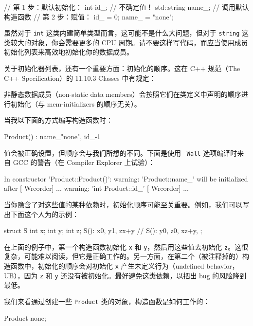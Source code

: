 \begin{codebox}[cpp]
// 第 1 步：默认初始化：
int id_; // 不确定值！
std::string name_; // 调用默认构造函数
// 第 2 步：赋值：
id_ = 0;
name_ = "none";
\end{codebox}

虽然对于 \texttt{int} 这类内建简单类型而言，这可能不是什么大问题，但对于 \texttt{string} 这类较大的对象，你会需要更多的 CPU 周期。请不要这样写代码，而应当使用成员初始化列表来高效地初始化你的数据成员。

关于初始化器列表，还有一个重要方面：初始化的顺序。这在 C++ 规范（The C++ Specification）的 11.10.3 Classes 中有规定：

\begin{myQuote}
非静态数据成员（non-static data members）会按照它们在类定义中声明的顺序进行初始化（与 mem-initializers 的顺序无关）。
\end{myQuote}

当我以下面的方式编写构造函数时：

\begin{codebox}[cpp]
Product() : name_{"none"}, id_{-1} { }
\end{codebox}

值会被正确设置，但顺序会与我们所想的不同。下面是使用 \texttt{-Wall} 选项编译时来自 GCC 的警告（在 Compiler Explorer 上试验）：

\begin{codebox}[cpp]
In constructor 'Product::Product()':
warning: 'Product::name_' will be initialized after [-Wreorder] ...
warning: 'int Product::id_' [-Wreorder] ...
\end{codebox}

当你隐含了对这些值的某种依赖时，初始化顺序可能至关重要。例如，我们可以写出下面这个人为的示例：

\begin{codebox}[cpp]
struct S {
int x;
int y;
int z;
S(): x{0}, y{1}, z{x+y} { }
// S(): y{0}, z{0}, x{z+y}, { }
};
\end{codebox}

在上面的例子中，第一个构造函数初始化 \texttt{x} 和 \texttt{y}，然后用这些值去初始化 \texttt{z}。这很复杂，可能难以阅读，但它是正确工作的。另一方面，在第二个（被注释掉的）构造函数中，初始化的顺序会对初始化 \texttt{x} 产生未定义行为（undefined behavior，UB），因为 \texttt{z} 和 \texttt{y} 还没有被初始化。最好避免这类依赖，以把出 bug 的风险降到最低。

我们来看通过创建一些 \texttt{Product} 类的对象，构造函数是如何工作的：

\begin{codebox}[cpp]
Product none;
\end{codebox}

